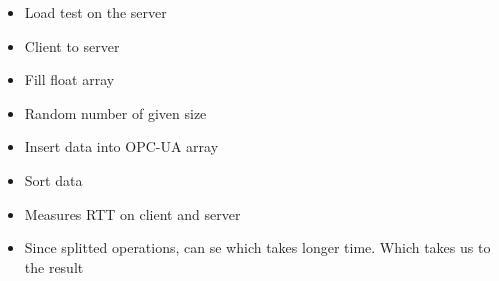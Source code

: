 \begin{itemize}
    \item Load test on the server
    \item Client to server
    \item Fill float array
    \item Random number of given size
    \item Insert data into OPC-UA array
    \item Sort data
    \item Measures RTT on client and server
    \item Since splitted operations, can se which takes longer time. Which takes us to the result
\end{itemize}